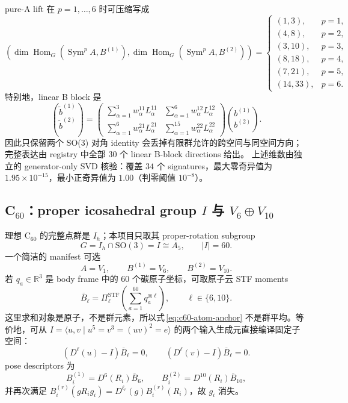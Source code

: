 \documentclass[11pt,a4paper,fontset=fandol]{ctexart}
\newcommand{\R}{\mathbb R}
\newcommand{\SO}{\mathrm{SO}}
\newcommand{\Sym}{\operatorname{Sym}}
\newcommand{\Hom}{\operatorname{Hom}}
\newcommand{\PiSTF}[1]{\Pi_{#1}^{\mathrm{STF}}}
\begin{document}
pure-A lift 在 $p=1,\ldots,6$ 时可压缩写成
\begin{equation}
\left(
\dim\Hom_G(\Sym^pA,B^{(1)}),
\dim\Hom_G(\Sym^pA,B^{(2)})
\right)
=
\begin{cases}
(1,3),&p=1,\\
(4,8),&p=2,\\
(3,10),&p=3,\\
(8,18),&p=4,\\
(7,21),&p=5,\\
(14,33),&p=6.
\end{cases}
\label{eq:benz-pure-a-dims}
\end{equation}
特别地，linear B block 是
\begin{equation}
\binom{\widetilde b^{(1)}}{\widetilde b^{(2)}}
=
\begin{pmatrix}
\sum_{\alpha=1}^{3}w^{11}_\alpha L^{11}_\alpha&
\sum_{\alpha=1}^{6}w^{12}_\alpha L^{12}_\alpha\\
\sum_{\alpha=1}^{6}w^{21}_\alpha L^{21}_\alpha&
\sum_{\alpha=1}^{15}w^{22}_\alpha L^{22}_\alpha
\end{pmatrix}
\binom{b^{(1)}}{b^{(2)}}.
\label{eq:benz-linear-block}
\end{equation}
因此只保留两个 SO(3) 对角 identity 会丢掉有限群允许的跨空间与同空间方向；完整表达由 registry 中全部 $30$ 个 linear B-block directions 给出。
上述维数由独立的 generator-only SVD 核验：覆盖 $34$ 个 signatures，最大零奇异值为
$1.95\times10^{-15}$，最小正奇异值为 $1.00$（判零阈值 $10^{-8}$）。

\subsection{C$_{60}$：proper icosahedral group $I$ 与 $V_6\oplus V_{10}$}

理想 C$_{60}$ 的完整点群是 $I_h$；本项目只取其 proper-rotation subgroup
\begin{equation}
  G=I_h\cap\SO(3)=I\cong A_5,
  \qquad |I|=60.
\end{equation}
一个简洁的 manifest 可选
\begin{equation}
  A=V_1,
  \qquad B^{(1)}=V_6,
  \qquad B^{(2)}=V_{10}.
\end{equation}
若 $q_a\in\R^3$ 是 body frame 中的 $60$ 个碳原子坐标，可取原子云 STF moments
\begin{equation}
  \overline B_\ell
  =\PiSTF{\ell}\!\left(\sum_{a=1}^{60}q_a^{\otimes\ell}\right),
  \qquad \ell\in\{6,10\}.
  \label{eq:c60-atom-anchor}
\end{equation}
这里求和对象是原子，不是群元素，所以式\,\eqref{eq:c60-atom-anchor} 不是群平均。等价地，可从 $I=\langle u,v\mid u^5=v^3=(uv)^2=e\rangle$ 的两个输入生成元直接编译固定子空间：
\begin{equation}
  (D^\ell(u)-I)\overline B_\ell=0,
  \qquad
  (D^\ell(v)-I)\overline B_\ell=0.
\end{equation}
pose descriptors 为
\begin{equation}
  B_i^{(1)}=D^6(R_i)\overline B_6,
  \qquad
  B_i^{(2)}=D^{10}(R_i)\overline B_{10},
\end{equation}
并再次满足 $B_i^{(r)}(gR_i g_i)=D^{\ell_r}(g)B_i^{(r)}(R_i)$，故 $g_i$ 消失。
\end{document}
